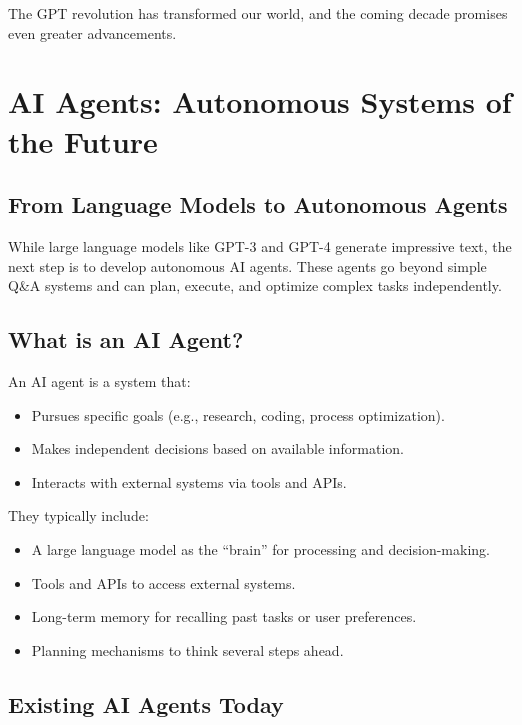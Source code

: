 The GPT revolution has transformed our world, and the coming decade promises even greater
advancements.


\section{AI Agents: Autonomous Systems of the Future}

\subsection{From Language Models to Autonomous Agents}

While large language models like GPT-3 and GPT-4 generate impressive text, the next step is
to develop autonomous AI agents. These agents go beyond simple Q\&A systems and can plan,
execute, and optimize complex tasks independently.

\subsection{What is an AI Agent?}

An AI agent is a system that:
\begin{itemize}
  \item Pursues specific goals (e.g., research, coding, process optimization).
  \item Makes independent decisions based on available information.
  \item Interacts with external systems via tools and APIs.
\end{itemize}
They typically include:
\begin{itemize}
  \item A large language model as the “brain” for processing and decision-making.
  \item Tools and APIs to access external systems.
  \item Long-term memory for recalling past tasks or user preferences.
  \item Planning mechanisms to think several steps ahead.
\end{itemize}

\subsection{Existing AI Agents Today}

